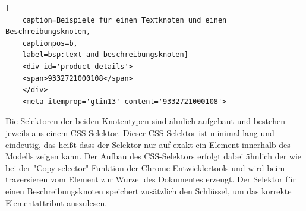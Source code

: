 \lstset{
    frame = single,
    language=html,
}
\begin{lstlisting}[
    caption=Beispiele für einen Textknoten und einen Beschreibungsknoten,
    captionpos=b,
    label=bsp:text-and-beschreibungsknoten]
    <div id='product-details'>
    <span>9332721000108</span>
    </div>
    <meta itemprop='gtin13' content='9332721000108'>
\end{lstlisting}

Die Selektoren der beiden Knotentypen sind ähnlich aufgebaut und bestehen jeweils aus einem CSS-Selektor.
Dieser CSS-Selektor ist minimal lang und eindeutig, das heißt dass der Selektor nur auf exakt ein Element innerhalb
des Modells zeigen kann.
Der Aufbau des CSS-Selektors erfolgt dabei ähnlich der wie bei der "Copy selector"-Funktion der
Chrome-Entwicklertools und wird beim traversieren vom Element zur Wurzel des Dokumentes erzeugt.
Der Selektor für einen Beschreibungsknoten speichert zusätzlich den Schlüssel, um das korrekte Elementattribut
auszulesen.

